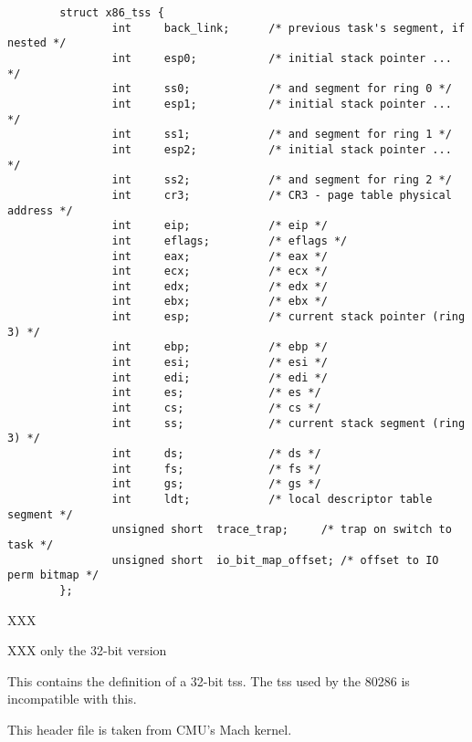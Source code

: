 \begin{apisyn}

	\begin{verbatim}
        struct x86_tss {
                int     back_link;      /* previous task's segment, if nested */
                int     esp0;           /* initial stack pointer ... */
                int     ss0;            /* and segment for ring 0 */
                int     esp1;           /* initial stack pointer ... */
                int     ss1;            /* and segment for ring 1 */
                int     esp2;           /* initial stack pointer ... */
                int     ss2;            /* and segment for ring 2 */
                int     cr3;            /* CR3 - page table physical address */
                int     eip;            /* eip */
                int     eflags;         /* eflags */
                int     eax;            /* eax */
                int     ecx;            /* ecx */
                int     edx;            /* edx */
                int     ebx;            /* ebx */
                int     esp;            /* current stack pointer (ring 3) */
                int     ebp;            /* ebp */
                int     esi;            /* esi */
                int     edi;            /* edi */
                int     es;             /* es */
                int     cs;             /* cs */
                int     ss;             /* current stack segment (ring 3) */
                int     ds;             /* ds */
                int     fs;             /* fs */
                int     gs;             /* gs */
                int     ldt;            /* local descriptor table segment */
                unsigned short  trace_trap;     /* trap on switch to task */
                unsigned short  io_bit_map_offset; /* offset to IO perm bitmap */
        };
        \end{verbatim}
\end{apisyn}
\begin{apidesc}
	XXX

	XXX only the 32-bit version

	This contains the definition of a 32-bit tss.
	The tss used by the 80286 is incompatible with this.

	This header file is taken from CMU's Mach kernel.
\end{apidesc}


\label{kern-x86pc-generic}

